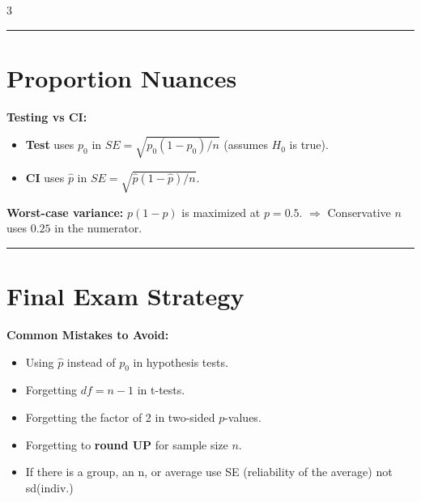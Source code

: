 \documentclass[10pt]{article}
\begin{document}
\begin{multicols}{3}
\hrule

\section*{Proportion Nuances}

\textbf{Testing vs CI:}
\begin{itemize}
    \item \textbf{Test} uses $p_0$ in $SE = \sqrt{p_0(1-p_0)/n}$ (assumes $H_0$ is true).
    \item \textbf{CI} uses $\hat{p}$ in $SE = \sqrt{\hat{p}(1-\hat{p})/n}$.
\end{itemize}

\textbf{Worst-case variance:}
$p(1-p)$ is maximized at $p = 0.5$.
$\Rightarrow$ Conservative $n$ uses $0.25$ in the numerator.

\hrule

\section*{Final Exam Strategy}

\textbf{Common Mistakes to Avoid:}
\begin{itemize}
    \item Using $\hat{p}$ instead of $p_0$ in hypothesis tests.
    \item Forgetting $df = n-1$ in t-tests.
    \item Forgetting the factor of 2 in two-sided $p$-values.
    \item Forgetting to \textbf{round UP} for sample size $n$.
    \item If there is a group, an n, or average use SE (reliability of the average) not sd(indiv.)
\end{itemize}


\end{multicols}
\end{document}
